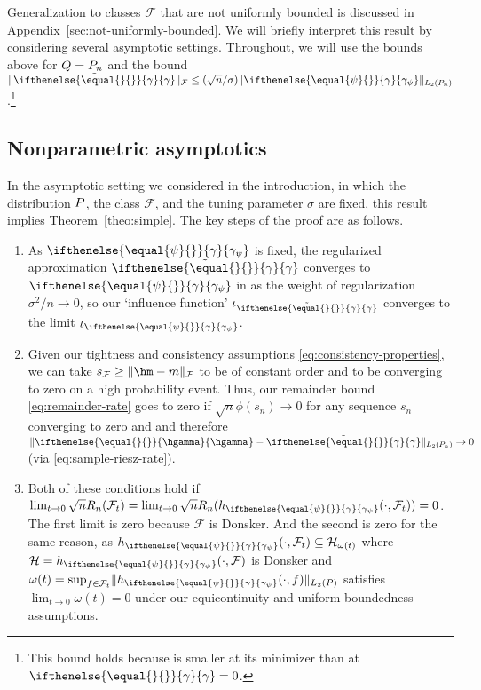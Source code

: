 \documentclass[aos,submission]{imsart}
\theoremstyle{plain}
\theoremstyle{remark}
\newcommand{\influence}{\iota}
\newcommand{\riesz}[1][]{\ifthenelse{\equal{#1}{}}{\gamma}{\gamma_{{#1}}}}
\newcommand{\hriesz}[1][]{\ifthenelse{\equal{#1}{}}{\hgamma}{\hgamma_{{#1}}}}
\newcommand{\HH}{\mathcal{H}}
\DeclarePairedDelimiter\norm{\lVert}{\rVert}
\newcommand{\F}{\mathcal{F}}
\begin{document}
Generalization to classes $\F$ that are not uniformly bounded is discussed in Appendix~\ref{sec:not-uniformly-bounded}.
We will briefly interpret this result by considering several asymptotic settings. 
Throughout, we will use the bounds above for $Q=\Pn$ and
the bound $\norm{\tilde\riesz}_{\F} \le (\sqrt{n}/\sigma)\norm{\riesz[\psi]}_{L_2(\Pn)}$.\footnote{
This bound holds because \smash{$\norm{\riesz - \riesz[\psi]}_{L_2(\Pn)}^2 + (\sigma^2/n)\norm{\riesz}_\F^2$}
is smaller at its minimizer than at $\riesz=0$.} 

\subsection{Nonparametric asymptotics}
\label{sec:nonparametric-asymptotics}
In the asymptotic setting we considered in the introduction,
in which the distribution $\P$, the class $\F$, and the tuning parameter $\sigma$ are fixed,
this result implies Theorem~\ref{theo:simple}.
The key steps of the proof are as follows. 
\begin{enumerate}
\item 
As $\riesz[\psi]$ is fixed, the regularized approximation $\tilde\riesz$ converges to $\riesz[\psi]$
in  as the weight of regularization $\sigma^2/n \to 0$, so our `influence function' $\influence_{\tilde\riesz}$ converges to 
the limit $\influence_{\riesz[\psi]}$. 

\item
Given our tightness and consistency assumptions
\eqref{eq:consistency-properties}, we can take $s_{\F} \ge \norm{\hm-m}_{\F}$ to be of constant order and  to be converging to zero on a high probability event.
Thus, our remainder bound \eqref{eq:remainder-rate} goes to zero if 
$\sqrt{n}\phi(s_n) \to 0$ for any sequence $s_n$ converging to zero and  and therefore $\norm{\hriesz - \tilde\riesz}_{L_2(\Pn)} \to 0$ (via \ref{eq:sample-riesz-rate}).

\item
Both of these conditions hold if
$\lim_{t \to 0}\sqrt{n}R_n(\F_{t}) = \lim_{t \to 0}\sqrt{n}R_n(h_{\riesz[\psi]}(\cdot,\F_{t})) = 0$.
The first limit is zero because $\F$ is Donsker. 
And the second is zero for the same reason, as
$h_{\riesz[\psi]}(\cdot,\F_t) \subseteq \HH_{\omega(t)}$ where $\HH = h_{\riesz[\psi]}(\cdot,\F)$
is Donsker and $\omega(t)=\sup_{f \in \F_t}\norm{h_{\riesz[\psi]}(\cdot, f)}_{L_2(\P)}$ 
satisfies $\lim_{t \to 0}\omega(t) = 0$ under our equicontinuity and uniform boundedness assumptions. 
\end{enumerate}
\end{document}
